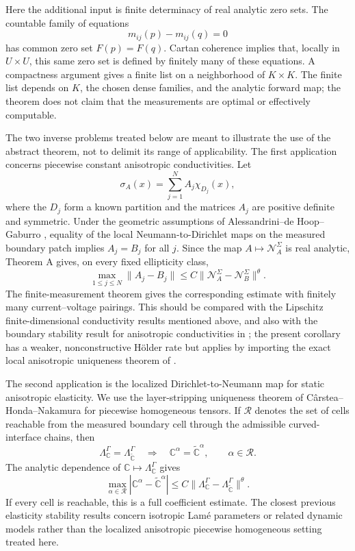 \documentclass[12pt,oneside]{amsart}
\newcommand{\cN}{\mathcal N}
\newcommand{\cR}{\mathcal R}
\begin{document}
Here the additional input is finite determinacy of real analytic zero sets.  The
countable family of equations
\[
        m_{ij}(p)-m_{ij}(q)=0
\]
has common zero set \(F(p)=F(q)\).  Cartan coherence implies that, locally in
\(U\times U\), this same zero set is defined by finitely many of these
equations.  A compactness argument gives a finite list on a neighborhood of
\(K\times K\).  The finite list depends on \(K\), the chosen dense families, and
the analytic forward map; the theorem does not claim that the measurements are
optimal or effectively computable.

The two inverse problems treated below are meant to illustrate the use of the
abstract theorem, not to delimit its range of applicability.  The first
application concerns piecewise constant anisotropic conductivities.  Let
\[
        \sigma_A(x)=\sum_{j=1}^N A_j\chi_{D_j}(x),
\]
where the \(D_j\) form a known partition and the matrices \(A_j\) are positive
definite and symmetric.  Under the geometric assumptions of
Alessandrini--de Hoop--Gaburro \cite{AlessandriniDeHoopGaburro2017}, equality of
the local Neumann-to-Dirichlet maps on the measured boundary patch implies
\(A_j=B_j\) for all \(j\).  Since the map
\(A\mapsto\cN_A^\Sigma\) is real analytic, Theorem A gives, on every fixed
ellipticity class,
\[
        \max_{1\le j\le N}\|A_j-B_j\|
        \le C
        \|\cN_A^\Sigma-\cN_B^\Sigma\|^\theta .
\]
The finite-measurement theorem gives the corresponding estimate with finitely
many current--voltage pairings.  This should be compared with the Lipschitz
finite-dimensional conductivity results mentioned above, and also with the
boundary stability result for anisotropic conductivities in
\cite{AlessandriniGaburroSincich2024}; the present corollary has a weaker,
nonconstructive H\"older rate but applies by importing the exact local
anisotropic uniqueness theorem of \cite{AlessandriniDeHoopGaburro2017}.

The second application is the localized Dirichlet-to-Neumann map for static
anisotropic elasticity.  We use the layer-stripping uniqueness theorem of
C\^arstea--Honda--Nakamura \cite{CarsteaHondaNakamura2018} for piecewise
homogeneous tensors.  If \(\cR\) denotes the set of cells reachable from the
measured boundary cell through the admissible curved-interface chains, then
\[
        \Lambda_{\mathbb C}^{\Gamma}
        =
        \Lambda_{\widetilde{\mathbb C}}^{\Gamma}
        \quad\Longrightarrow\quad
        \mathbb C^\alpha=\widetilde{\mathbb C}^{\alpha},
        \qquad \alpha\in\cR .
\]
The analytic dependence of
\(\mathbb C\mapsto\Lambda_{\mathbb C}^{\Gamma}\) gives
\[
        \max_{\alpha\in\cR}
        |\mathbb C^\alpha-\widetilde{\mathbb C}^{\alpha}|
        \le C
        \|\Lambda_{\mathbb C}^{\Gamma}
        -\Lambda_{\widetilde{\mathbb C}}^{\Gamma}\|^\theta .
\]
If every cell is reachable, this is a full coefficient estimate.  The closest
previous elasticity stability results concern isotropic Lam\'e parameters or
related dynamic models rather than the localized anisotropic piecewise
homogeneous setting treated here.
\end{document}
